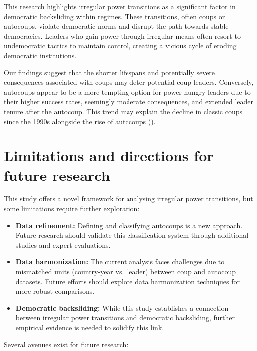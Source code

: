 \documentclass[
  12pt,
]{report}
\begin{document}
This research highlights irregular power transitions as a significant
factor in democratic backsliding within regimes. These transitions,
often coups or autocoups, violate democratic norms and disrupt the path
towards stable democracies. Leaders who gain power through irregular
means often resort to undemocratic tactics to maintain control, creating
a vicious cycle of eroding democratic institutions.

Our findings suggest that the shorter lifespans and potentially severe
consequences associated with coups may deter potential coup leaders.
Conversely, autocoups appear to be a more tempting option for
power-hungry leaders due to their higher success rates, seemingly
moderate consequences, and extended leader tenure after the autocoup.
This trend may explain the decline in classic coups since the 1990s
alongside the rise of autocoups ().

\section{Limitations and directions for future
research}\label{limitations-and-directions-for-future-research}

This study offers a novel framework for analysing irregular power
transitions, but some limitations require further exploration:

\begin{itemize}
\item
  \textbf{Data refinement:} Defining and classifying autocoups is a new
  approach. Future research should validate this classification system
  through additional studies and expert evaluations.
\item
  \textbf{Data harmonization:} The current analysis faces challenges due
  to mismatched units (country-year vs.~leader) between coup and
  autocoup datasets. Future efforts should explore data harmonization
  techniques for more robust comparisons.
\item
  \textbf{Democratic backsliding:} While this study establishes a
  connection between irregular power transitions and democratic
  backsliding, further empirical evidence is needed to solidify this
  link.
\end{itemize}

Several avenues exist for future research:
\end{document}

